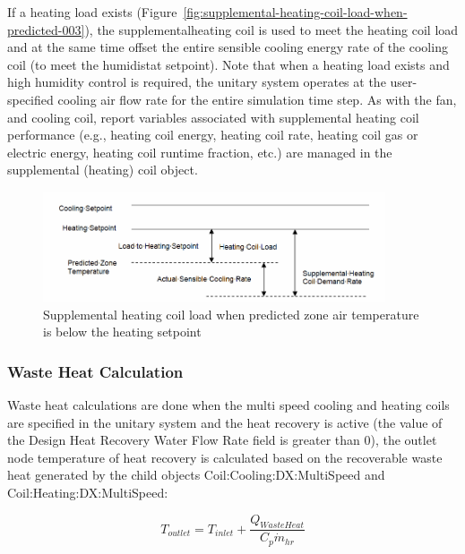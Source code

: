 If a heating load exists (Figure~\ref{fig:supplemental-heating-coil-load-when-predicted-003}), the supplementalheating coil is used to meet the heating coil load and at the same time offset the entire sensible cooling energy rate of the cooling coil (to meet the humidistat setpoint). Note that when a heating load exists and high humidity control is required, the unitary system operates at the user-specified cooling air flow rate for the entire simulation time step. As with the fan, and cooling coil, report variables associated with supplemental heating coil performance (e.g., heating coil energy, heating coil rate, heating coil gas or electric energy, heating coil runtime fraction, etc.) are managed in the supplemental (heating) coil object.

\begin{figure}[hbtp] %
\centering
\includegraphics[width=0.9\textwidth, height=0.9\textheight, keepaspectratio=true]{media/image5016.png}
\caption{Supplemental heating coil load when predicted zone air temperature is below the heating setpoint \protect \label{fig:supplemental-heating-coil-load-when-predicted-001}}
\end{figure}

\subsubsection{Waste Heat Calculation}\label{waste-heat-calculation}

Waste heat calculations are done when the multi speed cooling and heating coils are specified in the unitary system and the heat recovery is active (the value of the Design Heat Recovery Water Flow Rate field is greater than 0), the outlet node temperature of heat recovery is calculated based on the recoverable waste heat generated by the child objects Coil:Cooling:DX:MultiSpeed and Coil:Heating:DX:MultiSpeed:

\begin{equation}
{T_{outlet}} = {T_{inlet}} + \frac{{{Q_{WasteHeat}}}}{{{C_p}{{\dot m}_{hr}}}}
\end{equation}

